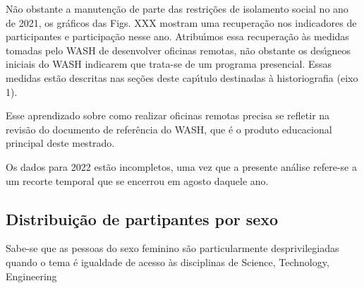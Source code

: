 \documentclass[
12pt,		%
openright,	%
twoside,  %
a4paper,			%
chapter=TITLE,		%
english,			%
french,				%
spanish,			%
brazil				%
]{USPSC-classe/USPSC}
\begin{document}
N\~ao obstante a manuten\c{c}\~ao de parte das restri\c{c}\~oes de isolamento social no ano de 2021, os gr\'aficos das Figs. XXX mostram uma recupera\c{c}\~ao nos indicadores de participantes e participa\c{c}\~ao nesse ano. Atribu\'{\i}mos essa recupera\c{c}\~ao \`as medidas tomadas pelo WASH de desenvolver oficinas remotas, n\~ao obstante os des\'{\i}gneos iniciais do WASH indicarem que trata-se de um programa presencial. Essas medidas est\~ao descritas nas se\c{c}\~oes deste cap\'{\i}tulo destinadas \`a historiografia (eixo 1).

















Esse aprendizado sobre como realizar oficinas remotas precisa se refletir na revis\~ao do documento de refer\^encia do WASH, que \'e o produto educacional principal deste mestrado.

















Os dados para 2022 est\~ao incompletos, uma vez que a presente an\'alise refere-se a um recorte temporal que se encerrou em agosto daquele ano.

















\subsection[Distribui\c{c}\~ao de partipantes por sexo]{Distribui\c{c}\~ao de partipantes por sexo}\label{Distribui\c{c}\~ao de partipantes por sexo}
Sabe-se que as pessoas do sexo feminino s\~ao particularmente desprivilegiadas quando o tema \'e igualdade de acesso \`as disciplinas de Science, Technology, Engineering 
\end{document}
